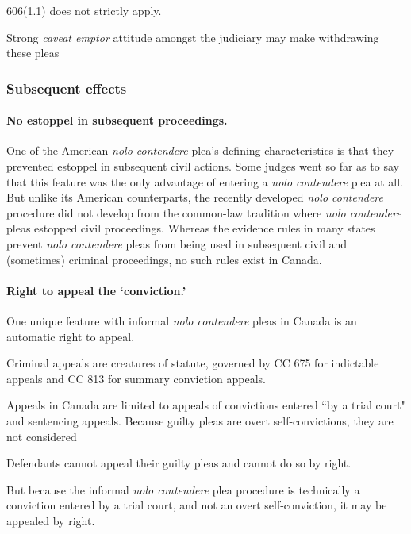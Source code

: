 606(1.1) does not strictly apply.

Strong \textit{caveat emptor} attitude amongst the judiciary may make withdrawing these pleas

\subsubsection{Subsequent effects}

\paragraph{No estoppel in subsequent proceedings.} One of the American \textit{nolo contendere} plea's defining characteristics is that they prevented estoppel in subsequent civil actions. Some judges went so far as to say that this feature was the only advantage of entering a \textit{nolo contendere} plea at all. But unlike its American counterparts, the recently developed \textit{nolo contendere} procedure did not develop from the common-law tradition where \textit{nolo contendere} pleas estopped civil proceedings. Whereas the evidence rules in many states prevent \textit{nolo contendere} pleas from being used in subsequent civil and (sometimes) criminal proceedings, no such rules exist in Canada. 

\paragraph{Right to appeal the `conviction.'} One unique feature with informal \textit{nolo contendere} pleas in Canada is an automatic right to appeal.

Criminal appeals are creatures of statute, governed by CC 675 for indictable appeals and CC 813 for summary conviction appeals.

Appeals in Canada are limited to appeals of convictions entered ``by a trial court" and sentencing appeals. Because guilty pleas are overt self-convictions, they are not considered 

Defendants cannot appeal their guilty pleas and cannot do so by right. 

But because the informal \textit{nolo contendere} plea procedure is technically a conviction entered by a trial court, and not an overt self-conviction, it may be appealed by right.
